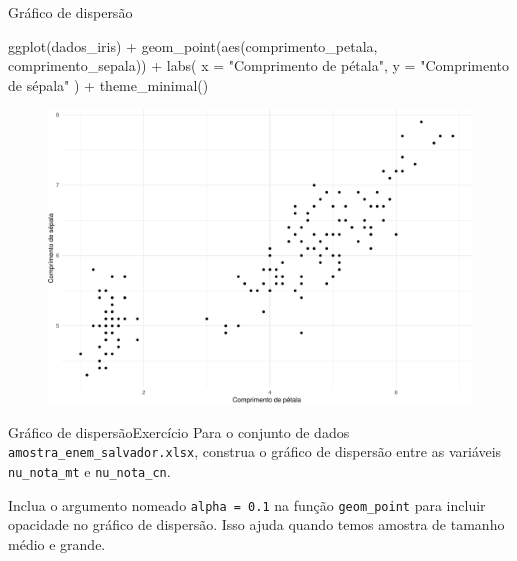 \documentclass[
  10pt,
  ignorenonframetext,
]{beamer}
\newenvironment{Shaded}{\begin{snugshade}}{\end{snugshade}}
\newcommand{\AttributeTok}[1]{\textcolor[rgb]{0.40,0.45,0.13}{#1}}
\newcommand{\FunctionTok}[1]{\textcolor[rgb]{0.28,0.35,0.67}{#1}}
\newcommand{\NormalTok}[1]{\textcolor[rgb]{0.00,0.23,0.31}{#1}}
\newcommand{\SpecialCharTok}[1]{\textcolor[rgb]{0.37,0.37,0.37}{#1}}
\newcommand{\StringTok}[1]{\textcolor[rgb]{0.13,0.47,0.30}{#1}}
\begin{document}
\begin{frame}[fragile]{Gráfico de dispersão}
\protect\hypertarget{gruxe1fico-de-dispersuxe3o}{}
\begin{Shaded}
\begin{Highlighting}[]
\FunctionTok{ggplot}\NormalTok{(dados\_iris) }\SpecialCharTok{+}
  \FunctionTok{geom\_point}\NormalTok{(}\FunctionTok{aes}\NormalTok{(comprimento\_petala, comprimento\_sepala)) }\SpecialCharTok{+}
  \FunctionTok{labs}\NormalTok{(}
    \AttributeTok{x =} \StringTok{"Comprimento de pétala"}\NormalTok{,}
    \AttributeTok{y =} \StringTok{"Comprimento de sépala"}
\NormalTok{  ) }\SpecialCharTok{+}
  \FunctionTok{theme\_minimal}\NormalTok{()}
\end{Highlighting}
\end{Shaded}
\end{frame}

\begin{frame}
\begin{figure}

{\centering \includegraphics[width=1\textwidth,height=\textheight]{exploracao-visualizacao_files/figure-beamer/unnamed-chunk-98-1.pdf}

}

\end{figure}
\end{frame}

\begin{frame}[fragile]{Gráfico de dispersão\newline Exercício}
\protect\hypertarget{gruxe1fico-de-dispersuxe3oexercuxedcio}{}
Para o conjunto de dados \texttt{amostra\_enem\_salvador.xlsx}, construa
o gráfico de dispersão entre as variáveis \texttt{nu\_nota\_mt} e
\texttt{nu\_nota\_cn}.

Inclua o argumento nomeado \texttt{alpha\ =\ 0.1} na função
\texttt{geom\_point} para incluir opacidade no gráfico de dispersão.
Isso ajuda quando temos amostra de tamanho médio e grande.
\end{frame}
\end{document}
